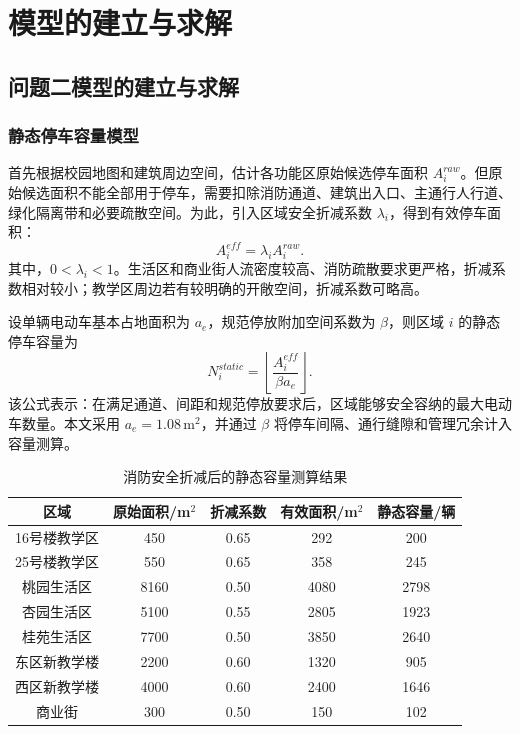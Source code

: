 \documentclass[UTF8,zihao=-4,a4paper]{ctexart}
\begin{document}
\section{模型的建立与求解}

\subsection{问题二模型的建立与求解}

\subsubsection{静态停车容量模型}

首先根据校园地图和建筑周边空间，估计各功能区原始候选停车面积 $A_i^{raw}$。但原始候选面积不能全部用于停车，需要扣除消防通道、建筑出入口、主通行人行道、绿化隔离带和必要疏散空间。为此，引入区域安全折减系数 $\lambda_i$，得到有效停车面积：
\begin{equation}
A_i^{eff}=\lambda_i A_i^{raw}.
\end{equation}
其中，$0<\lambda_i<1$。生活区和商业街人流密度较高、消防疏散要求更严格，折减系数相对较小；教学区周边若有较明确的开敞空间，折减系数可略高。

设单辆电动车基本占地面积为 $a_e$，规范停放附加空间系数为 $\beta$，则区域 $i$ 的静态停车容量为
\begin{equation}
N_i^{static}=\left\lfloor \frac{A_i^{eff}}{\beta a_e}\right\rfloor .
\end{equation}
该公式表示：在满足通道、间距和规范停放要求后，区域能够安全容纳的最大电动车数量。本文采用 $a_e=1.08\,\text{m}^2$，并通过 $\beta$ 将停车间隔、通行缝隙和管理冗余计入容量测算。

\begin{table}[H]
\centering
\caption{消防安全折减后的静态容量测算结果}
\label{tab:static_capacity}
\begin{tabular}{ccccc}
\toprule
\textbf{区域} & \textbf{原始面积/m$^2$} & \textbf{折减系数} & \textbf{有效面积/m$^2$} & \textbf{静态容量/辆} \\
\midrule
16号楼教学区 & 450 & 0.65 & 292 & 200 \\
25号楼教学区 & 550 & 0.65 & 358 & 245 \\
桃园生活区 & 8160 & 0.50 & 4080 & 2798 \\
杏园生活区 & 5100 & 0.55 & 2805 & 1923 \\
桂苑生活区 & 7700 & 0.50 & 3850 & 2640 \\
东区新教学楼 & 2200 & 0.60 & 1320 & 905 \\
西区新教学楼 & 4000 & 0.60 & 2400 & 1646 \\
商业街 & 300 & 0.50 & 150 & 102 \\
\bottomrule
\end{tabular}
\end{table}
\end{document}
